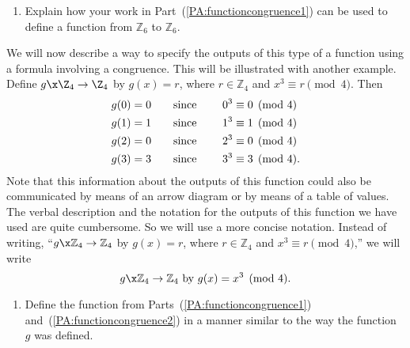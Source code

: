 \begin{previewactivity}
\begin{enumerate}
\item Explain how your work in Part~(\ref{PA:functioncongruence1}) can be used to define a function from   $\mathbb{Z}_6 $ to  $\mathbb{Z}_6 $. \label{PA:functioncongruence2}
\end{enumerate}
We will now describe a way to specify the outputs of this type of a function using a formula involving a congruence.  This will be illustrated with another example.  Define  
$g\x \Z_4  \to  \Z_4 $  by  $g( x ) = r$,  where  
$r \in \mathbb{Z}_4 $ and  $x^3  \equiv r \pmod 4$.  Then
\begin{align*}
g( 0 ) &= 0 	\text{\qquad since \qquad}   0^3  \equiv 0 \pmod 4 \\
g( 1 ) &= 1 	\text{\qquad since \qquad}   1^3  \equiv 1 \pmod 4 \\
g( 2 ) &= 0 	\text{\qquad since \qquad}   2^3  \equiv 0 \pmod 4 \\
g( 3 ) &= 3 	\text{\qquad since \qquad}   3^3  \equiv 3 \pmod 4.
\end{align*}
Note that this information about the outputs of this function could also be communicated by means of an arrow diagram or by means of a table of values.
The verbal description and the notation for the outputs of this function we have used are quite cumbersome.  So we will use a more concise notation.  Instead of writing,   
``$g\x \mathbb{Z}_4  \to \mathbb{Z}_4 $  by  $g( x ) = r$,  where  $r \in \mathbb{Z}_4 $ and 
$x^3  \equiv r \pmod 4$,'' we will write
\[
g\x \mathbb{Z}_4  \to \mathbb{Z}_4 \text{  by  }g( x ) = x^3 \pmod 4.
\]
\setcounter{oldenumi}{\theenumi}
\begin{enumerate} \setcounter{enumi}{\theoldenumi}
\item Define the function from Parts~(\ref{PA:functioncongruence1}) and~(\ref{PA:functioncongruence2}) in a manner similar to the way the function $g$ was defined.
\end{enumerate}
\end{previewactivity}
\hbreak

\endinput
